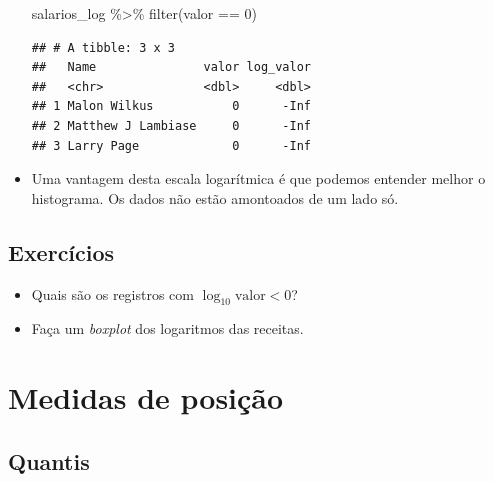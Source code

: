 \documentclass[
  11pt]{report}
\newenvironment{Shaded}{\begin{snugshade}}{\end{snugshade}}
\newcommand{\DecValTok}[1]{\textcolor[rgb]{0.00,0.00,0.81}{#1}}
\newcommand{\FunctionTok}[1]{\textcolor[rgb]{0.00,0.00,0.00}{#1}}
\newcommand{\NormalTok}[1]{#1}
\newcommand{\SpecialCharTok}[1]{\textcolor[rgb]{0.00,0.00,0.00}{#1}}
\renewenvironment{Shaded}{
    \begin{mdframed}[%
      roundcorner=2pt,%
      innerleftmargin=5pt,%
      innerrightmargin=5pt,%
      topline=true,%
      leftline=true,%
      rightline=true,%
      bottomline=true,%
      linewidth=0.5pt,%
      linecolor=black!20,%
      backgroundcolor=black!2,%
      skipabove=2ex,%
      skipbelow=2.5ex%
    ]%
  }
  {
    \end{mdframed}
  }
\begin{document}
\begin{itemize}
\begin{Shaded}
\begin{Highlighting}[]
\NormalTok{salarios\_log }\SpecialCharTok{\%\textgreater{}\%} 
  \FunctionTok{filter}\NormalTok{(valor }\SpecialCharTok{==} \DecValTok{0}\NormalTok{)}
\end{Highlighting}
\end{Shaded}

\begin{verbatim}
## # A tibble: 3 x 3
##   Name               valor log_valor
##   <chr>              <dbl>     <dbl>
## 1 Malon Wilkus           0      -Inf
## 2 Matthew J Lambiase     0      -Inf
## 3 Larry Page             0      -Inf
\end{verbatim}
\item
  Uma vantagem desta escala logarítmica é que podemos entender melhor o histograma. Os dados não estão amontoados de um lado só.
\end{itemize}

\hypertarget{exercuxedcios-7}{%
\subsection{Exercícios}\label{exercuxedcios-7}}

\begin{itemize}
\item
  Quais são os registros com $\log_{10} \text{valor} < 0$?
\item
  Faça um \emph{boxplot} dos logaritmos das receitas.
\end{itemize}

\hypertarget{medidas-de-posiuxe7uxe3o}{%
\section{Medidas de posição}\label{medidas-de-posiuxe7uxe3o}}

\hypertarget{quantis}{%
\subsection{Quantis}\label{quantis}}
\end{document}
